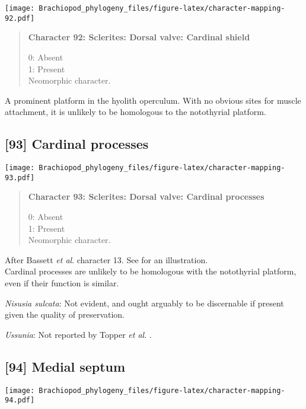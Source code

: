 \documentclass[openany]{book}
\theoremstyle{definition}
\theoremstyle{definition}
\theoremstyle{definition}
\theoremstyle{remark}
\begin{document}
\texttt{[image: Brachiopod\_phylogeny\_files/figure-latex/character-mapping-92.pdf]}

\begin{quote}
\textbf{Character 92: Sclerites: Dorsal valve: Cardinal shield}

0: Absent\\
1: Present\\
Neomorphic character.
\end{quote}

A prominent platform in the hyolith operculum. With no obvious sites for
muscle attachment, it is unlikely to be homologous to the notothyrial
platform.

\subsection*{{[}93{]} Cardinal processes}\label{cardinal-processes}

\texttt{[image: Brachiopod\_phylogeny\_files/figure-latex/character-mapping-93.pdf]}

\begin{quote}
\textbf{Character 93: Sclerites: Dorsal valve: Cardinal processes}

0: Absent\\
1: Present\\
Neomorphic character.
\end{quote}

After Bassett \emph{et al}.
\citeyearpar{Bassett2001Functionalmorphology} character 13. See
\citet{MartiMus2005} for an illustration.\\
Cardinal processes are unlikely to be homologous with the notothyrial
platform, even if their function is similar.

\hypertarget{Nisusia_sulcata-coding-93}{}
\emph{Nisusia sulcata}: Not evident, and ought arguably to be
discernable if present given the quality of preservation.

\hypertarget{Ussunia-coding-93}{}
\emph{Ussunia}: Not reported by Topper \emph{et al}.
\citeyearpar{Topper2013Reappraisalof}.

\subsection*{{[}94{]} Medial septum}\label{medial-septum}

\texttt{[image: Brachiopod\_phylogeny\_files/figure-latex/character-mapping-94.pdf]}
\end{document}
